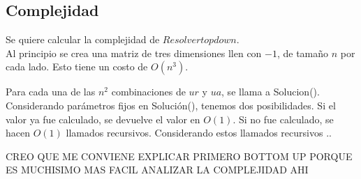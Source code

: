 \subsection{Complejidad}

Se quiere calcular la complejidad de $Resolver topdown$. \\

Al principio se crea una matriz de tres dimensiones llen con $-1$, de tamaño $n$ por cada lado. Esto tiene un costo de $O(n^3)$.

Para cada una de las $n^2$ combinaciones de $ur$ y $ua$, se llama a Solucion(). Considerando parámetros fijos en Solución(), tenemos dos posibilidades. Si el valor ya fue calculado, se devuelve el valor en $O(1)$. Si no fue calculado, se hacen $O(1)$ llamados recursivos. Considerando estos llamados recursivos .. 


CREO QUE ME CONVIENE EXPLICAR PRIMERO BOTTOM UP PORQUE ES MUCHISIMO MAS FACIL ANALIZAR LA COMPLEJIDAD AHI